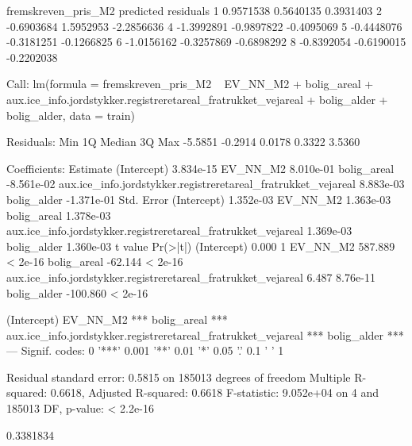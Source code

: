 \documentclass{report}
\begin{document}
\begin{Schunk}
\begin{Soutput}
  fremskreven_pris_M2  predicted  residuals
1           0.9571538  0.5640135  0.3931403
2          -0.6903684  1.5952953 -2.2856636
4          -1.3992891 -0.9897822 -0.4095069
5          -0.4448076 -0.3181251 -0.1266825
6          -1.0156162 -0.3257869 -0.6898292
8          -0.8392054 -0.6190015 -0.2202038
\end{Soutput}
\begin{Soutput}
Call:
lm(formula = fremskreven_pris_M2 ~ EV_NN_M2 + bolig_areal + aux.ice_info.jordstykker.registreretareal_fratrukket_vejareal + 
    bolig_alder + bolig_alder, data = train)

Residuals:
    Min      1Q  Median      3Q     Max 
-5.5851 -0.2914  0.0178  0.3322  3.5360 

Coefficients:
                                                                Estimate
(Intercept)                                                    3.834e-15
EV_NN_M2                                                       8.010e-01
bolig_areal                                                   -8.561e-02
aux.ice_info.jordstykker.registreretareal_fratrukket_vejareal  8.883e-03
bolig_alder                                                   -1.371e-01
                                                              Std. Error
(Intercept)                                                    1.352e-03
EV_NN_M2                                                       1.363e-03
bolig_areal                                                    1.378e-03
aux.ice_info.jordstykker.registreretareal_fratrukket_vejareal  1.369e-03
bolig_alder                                                    1.360e-03
                                                               t value Pr(>|t|)
(Intercept)                                                      0.000        1
EV_NN_M2                                                       587.889  < 2e-16
bolig_areal                                                    -62.144  < 2e-16
aux.ice_info.jordstykker.registreretareal_fratrukket_vejareal    6.487 8.76e-11
bolig_alder                                                   -100.860  < 2e-16
                                                                 
(Intercept)                                                      
EV_NN_M2                                                      ***
bolig_areal                                                   ***
aux.ice_info.jordstykker.registreretareal_fratrukket_vejareal ***
bolig_alder                                                   ***
---
Signif. codes:  0 '***' 0.001 '**' 0.01 '*' 0.05 '.' 0.1 ' ' 1

Residual standard error: 0.5815 on 185013 degrees of freedom
Multiple R-squared:  0.6618,	Adjusted R-squared:  0.6618 
F-statistic: 9.052e+04 on 4 and 185013 DF,  p-value: < 2.2e-16
\end{Soutput}
\begin{Soutput}
[1] 0.3381834
\end{Soutput}
\end{Schunk}
\end{document}
